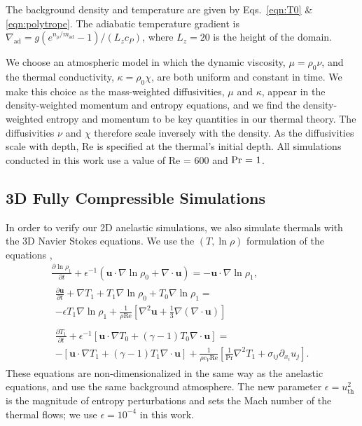 \documentclass[twocolumn, amsmath, amsfonts, amssymb, trackchanges]{aastex62}
\newcommand{\DivU}{\ensuremath{\nabla\cdot\bm{u}}}
\newcommand{\grad}{\ensuremath{\nabla}}
\begin{document}
The background density and temperature are given by Eqs.~\ref{eqn:T0} \& \ref{eqn:polytrope}.
The adiabatic temperature gradient is $\nabla_{\text{ad}}=g(e^{n_\rho/m_{\text{ad}}}-1)/(L_z c_P)$, where $L_z=20$ is the height of the domain.

We choose an atmospheric model in which the dynamic viscosity, $\mu = \rho_0 \nu$, and the thermal conductivity, $\kappa = \rho_0 \chi$, are both uniform and constant in time.
We make this choice as the mass-weighted diffusivities, $\mu$ and $\kappa$, appear in the density-weighted momentum and entropy equations, and we find the density-weighted entropy and momentum to be key quantities in our thermal theory.
The diffusivities $\nu$ and $\chi$ therefore scale inversely with the density.
As the diffusivities scale with depth, Re is specified at the thermal's initial depth.
All simulations conducted in this work use a value of Re = 600 and $\mbox{\text{Pr} = 1}$.

\subsection{3D Fully Compressible Simulations}
In order to verify our 2D anelastic simulations, we also simulate thermals with the 3D Navier Stokes equations. 
We use the $(T, \ln\rho)$ formulation of the equations \citep{lecoanet&all2014, anders&brown2017},
\begin{gather}
\frac{\partial \ln\rho_1}{\partial t} + \epsilon^{-1}\left(\bm{u}\cdot\grad\ln\rho_0 + \DivU\right) = -\bm{u}\cdot\grad\ln\rho_1, \\
\begin{split}
\frac{\partial \bm{u}}{\partial t}  +\grad T_1 + T_1\grad\ln\rho_0 + T_0\grad\ln\rho_1  =\\
- \epsilon T_1\grad\ln\rho_1 + \frac{1}{\rho\text{Re}}\left[\grad^2\bm{u} + \frac{1}{3}\grad(\DivU)\right]
\end{split} \\
\begin{split}
\frac{\partial T_1}{\partial t} + \epsilon^{-1}\left[\bm{u}\cdot\grad T_0 + (\gamma-1)T_0\DivU\right] = \\
-\left[\bm{u}\cdot\grad T_1 + (\gamma-1)T_1\DivU\right] + \frac{1}{\rho c_V\text{Re}}\left[\frac{1}{\text{Pr}}\grad^2 T_1 + \sigma_{ij}\partial_{x_i}u_j\right].
\end{split}
\end{gather}
These equations are non-dimensionalized in the same way as the anelastic equations, and use the same background atmosphere.
The new parameter $\epsilon = u_{\text{th}}^2$ is the magnitude of entropy perturbations and sets the Mach number of the thermal flows; we use $\epsilon = 10^{-4}$ in this work. 
\end{document}
